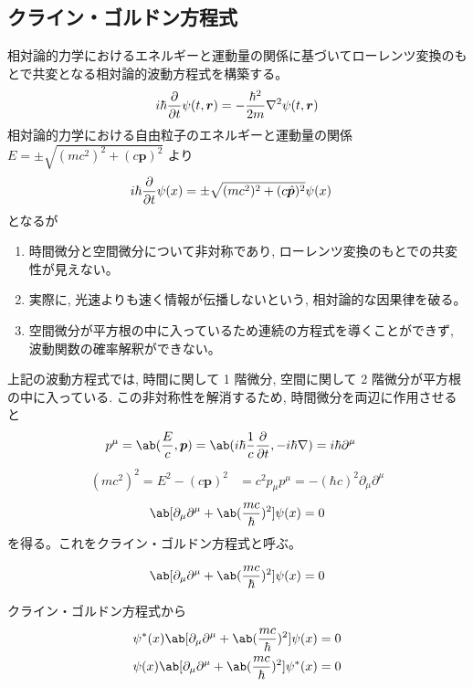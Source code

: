 \documentclass[uplatex,dvipdfmx,a4paper,11pt]{jlreq}
\newcommand{\rr}{\bm{r}}
\newcommand{\pp}{\bm{p}}
\numberwithin{equation}{section}
\theoremstyle{definition}
\begin{document}
\subsection{クライン・ゴルドン方程式}
相対論的力学におけるエネルギーと運動量の関係に基づいてローレンツ変換のもとで共変となる相対論的波動方程式を構築する。
\begin{align}
  i\hbar\diffp{}{t}\psi(t, \rr) = -\frac{\hbar^2}{2m}\nabla^2\psi(t, \rr)
\end{align}
相対論的力学における自由粒子のエネルギーと運動量の関係 $E = \pm\sqrt{(mc^2)^2 + (c\pp)^2}$ より
\begin{align}
  i\hbar\diffp{}{t}\psi(x) & = \pm\sqrt{(mc^2)^2 + (c\hat{\pp})^2}\psi(x)
\end{align}
となるが
\begin{enumerate}
  \item 時間微分と空間微分について非対称であり, ローレンツ変換のもとでの共変性が見えない。
  \item 実際に, 光速よりも速く情報が伝播しないという, 相対論的な因果律を破る。
  \item 空間微分が平方根の中に入っているため連続の方程式を導くことができず, 波動関数の確率解釈ができない。
\end{enumerate}
上記の波動方程式では, 時間に関して 1 階微分, 空間に関して 2 階微分が平方根の中に入っている. この非対称性を解消するため, 時間微分を両辺に作用させると
\begin{align}
  p^\mu & = \ab(\frac{E}{c}, \pp) = \ab(i\hbar\frac{1}{c}\diffp{}{t}, -i\hbar\nabla) = i\hbar\partial^\mu
\end{align}
\begin{align}
  (mc^2)^2 = E^2 - (c\pp)^2 & = c^2p_\mu p^\mu = -(\hbar c)^2\partial_\mu\partial^\mu
\end{align}
\begin{align}
  \ab[\partial_\mu\partial^\mu + \ab(\frac{mc}{\hbar})^2]\psi(x) = 0
\end{align}
を得る。これをクライン・ゴルドン方程式と呼ぶ。
\begin{definition}
  \begin{align}
    \ab[\partial_\mu\partial^\mu + \ab(\frac{mc}{\hbar})^2]\psi(x) = 0
  \end{align}
\end{definition}
クライン・ゴルドン方程式から
\begin{align}
  \psi^*(x)\ab[\partial_\mu\partial^\mu + \ab(\frac{mc}{\hbar})^2]\psi(x) = 0 \\
  \psi(x)\ab[\partial_\mu\partial^\mu + \ab(\frac{mc}{\hbar})^2]\psi^*(x) = 0
\end{align}
\end{document}
